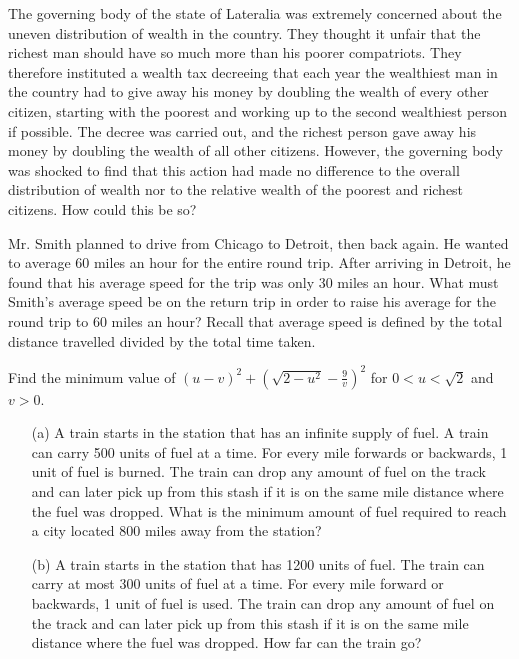 \documentclass{article}
\begin{document}
\begin{exercise}
    The governing body of the state of Lateralia was extremely concerned about the uneven distribution of wealth in the country. 
    They thought it unfair that the richest man should have so much more than his poorer compatriots. 
    They therefore instituted a wealth tax decreeing that each year the wealthiest man in the country had to give away his money by doubling the wealth of every other citizen, starting with the poorest and working up to the second wealthiest person if possible. 
    The decree was carried out, and the richest person gave away his money by doubling the wealth of all other citizens.
    However, the governing body was shocked to find that this action had made no difference to the overall distribution of wealth nor to the relative wealth of the poorest and richest citizens. 
    How could this be so?
\end{exercise}

\begin{exercise}
    Mr. Smith planned to drive from Chicago to Detroit, then back again. 
    He wanted to average 60 miles an hour for the entire round trip. 
    After arriving in Detroit, he found that his average speed for the trip was only 30 miles an hour. 
    What must Smith's average speed be on the return trip in order to raise his average for the round trip to 60 miles an hour? 
    Recall that average speed is defined by the total distance travelled divided by the total time taken.
\end{exercise}

\begin{exercise}
    Find the minimum value of \((u-v)^2+\left(\sqrt{2-u^2}-\frac{9}{v}\right)^2\) for \(0<u<\sqrt{2}\) and \(v>0\).
\end{exercise}

\begin{exercise}
    \begin{enumerate}
        \item[(a)] A train starts in the station that has an infinite supply of fuel.
        A train can carry 500 units of fuel at a time.
        For every mile forwards or backwards, 1 unit of fuel is burned.
        The train can drop any amount of fuel on the track and can later pick up from this stash if it is on the same mile distance where the fuel was dropped. 
        What is the minimum amount of fuel required to reach a city located 800 miles away from the station?
        \item[(b)] A train starts in the station that has 1200 units of fuel. 
        The train can carry at most 300 units of fuel at a time. 
        For every mile forward or backwards, 1 unit of fuel is used. 
        The train can drop any amount of fuel on the track and can later pick up from this stash if it is on the same mile distance where the fuel was dropped. 
        How far can the train go?
    \end{enumerate}
\end{exercise}
\end{document}
